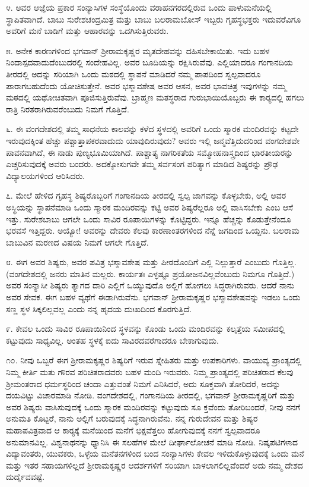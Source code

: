  ೪. ಅವರ ಆಜ್ಞೆಯ ಪ್ರಕಾರ ಸಂನ್ಯಾಸಿಗಳ ಸಂಸ್ಥೆಯೊಂದು ವರಾಹನಗರದಲ್ಲಿರುವ ಒಂದು ಪಾಳುಮನೆಯಲ್ಲಿ ಸ್ಥಾಪಿತವಾಗಿದೆ. ಬಾಬು ಸುರೇಶಚಂದ್ರಮಿತ್ರ ಮತ್ತು ಬಾಬು ಬಲರಾಮಬೋಸ್ ಇಬ್ಬರು ಗೃಹಸ್ಥಭಕ್ತರು ಇದುವರೆವಿಗೂ ಅವರಿಗೆ ಮನೆ ಬಾಡಿಗೆ ಮತ್ತು ಆಹಾರವನ್ನು ಒದಗಿಸುತ್ತಿರುವರು. 

 ೫. ಅನೇಕ ಕಾರಣಗಳಿಂದ ಭಗವಾನ್ ಶ‍್ರೀರಾಮಕೃಷ್ಣರ ಮೃತದೇಹವನ್ನು ದಹಿಸಬೇಕಾಯಿತು. ಇದು ಬಹಳ ನಿಂದಾಸ್ಪದವಾದುದೆಂಬುದರಲ್ಲಿ ಸಂದೇಹವಿಲ್ಲ. ಅವರ ಬೂದಿಯನ್ನು ರಕ್ಷಿಸಿರುವೆವು. ಎಲ್ಲಿಯಾದರೂ ಗಂಗಾನದಿಯ ತೀರದಲ್ಲಿ ಅದನ್ನು ಸರಿಯಾಗಿ ಒಂದು ಮಠದಲ್ಲಿ ಸ್ಥಾಪನೆ ಮಾಡಿದರೆ ನಮ್ಮ ಪಾಪದಿಂದ ಸ್ವಲ್ಪವಾದರೂ ಪಾರಾಗಬಹುದೆಂದು ಯೋಚಿಸುತ್ತೇನೆ. ಅವರ ಭಸ್ಮಾವಶೇಷ ಅವರ ಆಸನ, ಅವರ ಭಾವಚಿತ್ರ ಇವುಗಳನ್ನು ನಮ್ಮ ಮಠದಲ್ಲಿ ಯಥೋಚಿತವಾಗಿ ಪೂಜಿಸುತ್ತಿರುವೆವು. ಬ್ರಾಹ್ಮಣ ಮತಸ್ಥರಾದ ಗುರುಭಾಯಿಯೊಬ್ಬರು ಈ ಕಾರ‍್ಯದಲ್ಲಿ ಹಗಲು ರಾತ್ರಿ ನಿರತರಾಗಿರುವರೆಂಬುದು ನಿಮಗೆ ಗೊತ್ತಿದೆ. 

 ೬. ಈ ವಂಗದೇಶದಲ್ಲಿ ತಮ್ಮ ಸಾಧನೆಯ ಕಾಲವನ್ನು ಕಳೆದ ಸ್ಥಳದಲ್ಲಿ ಅವರಿಗೆ ಒಂದು ಸ್ಮಾರಕ ಮಂದಿರವನ್ನು ಕಟ್ಟದೇ ಇರುವುದಕ್ಕಿಂತ ಹೆಚ್ಚು ಪಶ್ಚಾತ್ತಾಪಕರವಾದುದು ಯಾವುದಿರುವುದು? ಅವರು ಇಲ್ಲಿ ಜನ್ಮವೆತ್ತಿದುದರಿಂದ ವಂಗದೇಶವೇ ಪಾವನವಾಗಿದೆ, ಈ ನಾಡು ಪುಣ್ಯಭೂಮಿಯಾಗಿದೆ. ಪಾಶ್ಚಾತ್ಯ ನಾಗರಿಕತೆಯ ಸಮ್ಮೋಹನಾಸ್ತ್ರದಿಂದ ಭಾರತೀಯರನ್ನು ಎಚ್ಚರಿಸುವುದಕ್ಕೆ ಅವರು ಬಂದರು. ಅದಕ್ಕೋಸುಗವೇ ತಮ್ಮ ಸರ್ವಸಂಗ ಪರಿತ್ಯಾಗ ಮಾಡಿದ ಶಿಷ್ಯರನ್ನು ಪ್ರೌಢ ವಿದ್ಯಾಲಯಗಳಿಂದ ಆರಿಸಿದರು. 

 ೭. ಮೇಲೆ ಹೇಳಿದ ಗೃಹಸ್ಥ ಶಿಷ್ಯರೊಬ್ಬರಿಗೆ ಗಂಗಾನದಿಯ ತೀರದಲ್ಲಿ ಸ್ವಲ್ಪ ಜಾಗವನ್ನು ಕೊಳ್ಳಬೇಕು, ಅಲ್ಲಿ ಅವರ ಅಸ್ಥಿಯನ್ನು ಸ್ಥಾಪನೆಮಾಡಿ ಒಂದು ಸ್ಮಾರಕ ಮಂದಿರವನ್ನು ಕಟ್ಟಿ ಅವರ ಶಿಷ್ಯರೆಲ್ಲರೂ ಅಲ್ಲಿ ವಾಸಿಸಬೇಕು ಎಂಬ ಆಸೆ ಇತ್ತು. ಸುರೇಶಬಾಬು ಆಗಲೇ ಒಂದು ಸಾವಿರ ರೂಪಾಯಿಗಳನ್ನು ಕೊಟ್ಟಿದ್ದರು. ಇನ್ನೂ ಹೆಚ್ಚನ್ನು ಕೊಡುತ್ತೇನೆಂದೂ ಭರವಸೆ ಇತ್ತಿದ್ದರು. ಅಯ್ಯೋ! ಅವರನ್ನು ದೇವರು ಕೆಲವು ಕಾರಣಾಂತರಗಳಿಂದ ನೆನ್ನೆ ಜಗದಿಂದ ಒಯ್ದನು. ಬಲರಾಮ ಬಾಬುವಿನ ಮರಣದ ವಿಷಯ ನಿಮಗೆ ಆಗಲೇ ಗೊತ್ತಿದೆ. 

 ೮. ಈಗ ಅವರ ಶಿಷ್ಯರು, ಅವರ ಪವಿತ್ರ ಭಸ್ಮಾವಶೇಷ ಮತ್ತು ಪೀಠದೊಂದಿಗೆ ಎಲ್ಲಿ ನಿಲ್ಲುತ್ತಾರೆ ಎಂಬುದು ಗೊತ್ತಿಲ್ಲ. (ವಂಗದೇಶದಲ್ಲಿ ಜನರು ಮಾತಿನ ಮಲ್ಲರು. ಕಾರ್ಯತಃ ಎಳ್ಳಷ್ಟೂ ಪ್ರಯೋಜನವಿಲ್ಲವೆಂಬುದು ನಿಮಗೂ ಗೊತ್ತಿದೆ.) ಅವರ ಸಂನ್ಯಾಸೀ ಶಿಷ್ಯರು ತ್ಯಾಗದ ದಾರಿ ಎಲ್ಲಿಗೆ ಒಯ್ಯುವುದೊ ಅಲ್ಲಿಗೆ ಹೋಗಲು ಸಿದ್ಧರಾಗಿರುವರು. ಆದರೆ ನಾನು ಅವರ ಸೇವಕ. ಈಗ ಬಹಳ ವ್ಯಥೆಗೆ ಈಡಾಗಿರುವೆನು. ಭಗವಾನ್ ಶ‍್ರೀರಾಮಕೃಷ್ಣರ ಭಸ್ಮಾವಶೇಷವನ್ನು ಇಡಲು ಒಂದು ಸಣ್ಣ ಸ್ಥಳ ಸಿಕ್ಕಲಿಲ್ಲವಲ್ಲ ಎಂದು ನನ್ನ ಹೃದಯ ದುಃಖದಿಂದ ಕೊರಗುತ್ತಿದೆ. 

 ೯. ಕೇವಲ ಒಂದು ಸಾವಿರ ರೂಪಾಯಿನಿಂದ ಸ್ಥಳವನ್ನು ಕೊಂಡು ಒಂದು ಮಂದಿರವನ್ನು ಕಲ್ಕತ್ತೆಯ ಸಮೀಪದಲ್ಲಿ ಕಟ್ಟುವುದು ಸಾಧ್ಯವಿಲ್ಲ. ಅಂತಹ ಸ್ಥಳಕ್ಕೆ ಐದು ಸಾವಿರದವರೆಗಾದರೂ ಬೇಕಾಗುವುದು. 

 ೧೦. ನೀವು ಒಬ್ಬರೆ ಈಗ ಶ‍್ರೀರಾಮಕೃಷ್ಣರ ಶಿಷ್ಯರಿಗೆ ಇರುವ ಸ್ನೇಹಿತರು ಮತ್ತು ಉಪಕಾರಿಗಳು. ವಾಯುವ್ಯ ಪ್ರಾಂತ್ಯದಲ್ಲಿ ನಿಮ್ಮ ಕೀರ್ತಿ ಮತು ಗೌರವ ಪರಿಚಿತರಾದವರು ಬಹಳ ಮಂದಿ ಇರುವರು. ನಿಮ್ಮ ಪ್ರಾಂತ್ಯದಲ್ಲಿ ಪರಿಚಿತರಾದ ಕೆಲವು ಶ‍್ರೀಮಂತರಾದ ಧರ್ಮಸ್ಥರಿಂದ ಚಂದಾ ಎತ್ತುವಂತೆ ನಿಮಗೆ ಎನಿಸಿದರೆ, ಅದು ಸೂಕ್ತವಾಗಿ ತೋರಿದರೆ, ಅದನ್ನು ದಯವಿಟ್ಟು ವಿಚಾರಮಾಡಿ ನೋಡಿ. ವಂಗದೇಶದಲ್ಲಿ, ಗಂಗಾನದಿಯ ತೀರದಲ್ಲಿ, ಭಗವಾನ್ ಶ‍್ರೀರಾಮಕೃಷ್ಣರಿಗೆ ಮತ್ತು ಅವರ ಶಿಷ್ಯರು ವಾಸಿಸುವುದಕ್ಕೆ ಒಂದು ಸ್ಮಾರಕ ಮಂದಿರವನ್ನು ಕಟ್ಟುವುದು ಸೂ ಕ್ತವೆಂದು ತೋರಿಬಂದರೆ, ನೀವು ನನಗೆ ಅನುಮತಿ ಕೊಟ್ಟರೆ, ನಾನು ಅಲ್ಲಿಗೆ ಬರುವುದಕ್ಕೆ ಸಿದ್ಧನಾಗಿರುವೆನು. ನನ್ನ ಗುರುದೇವನ ಮತ್ತು ಶಿಷ್ಯರ ಮಹಾಪವಿತ್ರವಾದ ಆ ಕಾರ‍್ಯಕ್ಕೆ ಮನೆಯಿಂದ ಮನೆಗೆ ಭಿಕ್ಷವೆತ್ತಲು ಹೋಗುವುದಕ್ಕೆ ನನಗೆ ಸ್ವಲ್ಪವಾದರೂ ಅನುಮಾನವಿಲ್ಲ. ವಿಶ್ವನಾಥನನ್ನು ಧ್ಯಾನಿಸಿ ಈ ಸಲಹೆಗಳ ಮೇಲೆ ದೀರ್ಘಾಲೋಚನೆ ಮಾಡಿ ನೋಡಿ. ನಿಷ್ಕಪಟಿಗಳಾದ ವಿದ್ಯಾವಂತರು, ಯುವಕರು, ಒಳ್ಳೆಯ ಮನೆತನಗಳಿಂದ ಬಂದ ಸಂನ್ಯಾಸಿಗಳು ಕೇವಲ ಇಳಿದುಕೊಳ್ಳುವುದಕ್ಕೆ ಒಂದು ಮನೆ ಮತ್ತು ಇತರ ಸಹಾಯಗಳಿಲ್ಲದೆ ಶ‍್ರೀರಾಮಕೃಷ್ಣರ ಆದರ್ಶಗಳಿಗೆ ಸರಿಯಾಗಿ ಬಾಳಲಾಗಲಿಲ್ಲವೆಂದರೆ ಅದು ನಮ್ಮ ದೇಶದ ದುರ್ದೈವವಷ್ಟೆ. 

